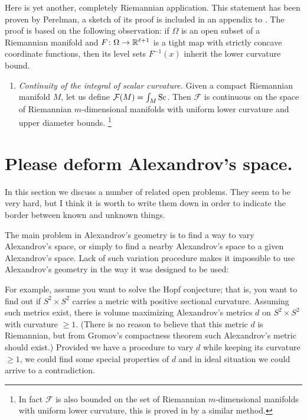 \documentclass{article}
\begin{document}
Here is yet another, completely Riemannian application. This statement has been
proven by Perelman, a sketch of its proof is included in an appendix to
\cite{petrunin:PL}.
The proof is based on the following observation: if $\Omega$ is an open subset of a Riemannian manifold and  $F\colon\Omega\to\mathbb{R}^{\ell+1}$ is a tight map with strictly concave coordinate functions, then its level sets $F^{-1}(x)$ inherit the lower curvature bound. 
\begin{enumerate}[$\diamond$]
\item \emph{Continuity of the integral of scalar curvature.} 
Given  a compact Riemannian manifold $M$, let us define $\mathcal F(M)=\int_M\operatorname{Sc}$. 
Then $\mathcal F$ is continuous on the space of Riemannian
$m$-dimensional manifolds with uniform lower curvature and upper diameter
bounds.%
\footnote{In fact $\mathcal F$ is also bounded on the set of Riemannian
$m$-dimensional manifolds with uniform lower curvature, this is proved in
\cite{petrunin:scalar} by a similar method.}
\end{enumerate}















\section{Please deform Alexandrov's space.}
\setcounter{subsection}{1}

In this section we discuss a number of related open problems. 
They seem to be very hard, but I think it is worth to
write them down in order to indicate the border between known and unknown things.

The main problem in Alexandrov's geometry is to find a way to vary Alexandrov's
space, or simply to find a nearby Alexandrov's space to a given Alexandrov's
space. 
Lack of such variation procedure makes it impossible to use Alexandrov's
geometry in the way it was designed to be used: 

For example, assume you want to solve the Hopf conjecture;
that is, you want to find out
if $S^2\times S^2$ carries a metric with positive sectional curvature. 
Assuming such metrics exist, 
there is volume maximizing Alexandrov's metrics $d$
on $S^2\times S^2$ with curvature $\ge 1$.
(There is no reason to believe
that this metric $d$ is Riemannian, but from Gromov's compactness theorem such
Alexandrov's metric should exist.)
Provided we have a procedure to vary $d$ while keeping its curvature $\ge 1$,
we could find some special properties of $d$  and in ideal situation we could arrive to a contradiction.
\end{document}
